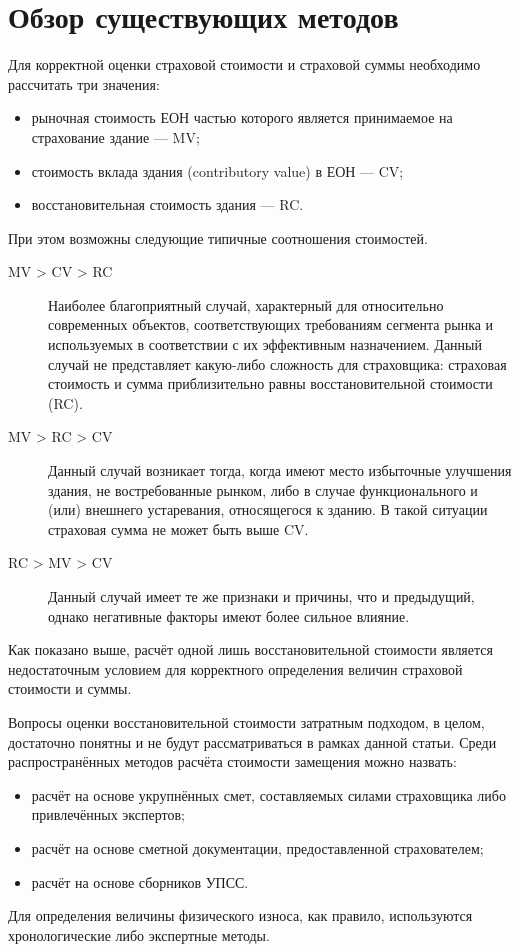 \documentclass[12pt]{scrartcl}
\begin{document}
\section{Обзор существующих методов}\label{LiteratureReview}
Для корректной оценки страховой стоимости и страховой суммы необходимо рассчитать три значения:
\begin{itemize}
    \item рыночная стоимость ЕОН частью которого является принимаемое на страхование здание --- MV;
    \item стоимость вклада здания (contributory value) в ЕОН --- CV;
    \item восстановительная стоимость здания --- RC.
\end{itemize}
При этом возможны следующие типичные соотношения стоимостей.
\begin{description}
    \item[MV > CV > RC] Наиболее благоприятный случай, характерный для относительно современных объектов, соответствующих требованиям сегмента рынка и используемых в соответствии с их эффективным назначением. Данный случай не представляет какую-либо сложность для страховщика: страховая стоимость и сумма приблизительно равны восстановительной стоимости (RC).
    \item[MV > RC > CV] Данный случай возникает тогда, когда имеют место избыточные улучшения здания, не востребованные рынком, либо в случае функционального и (или) внешнего устаревания, относящегося к зданию. В такой ситуации страховая сумма не может быть выше CV.
    \item[RC > MV > CV] Данный случай имеет те же признаки и причины, что и предыдущий, однако негативные факторы имеют более сильное влияние.
\end{description}
Как показано выше, расчёт одной лишь восстановительной стоимости является недостаточным условием для корректного определения величин страховой стоимости и суммы.

Вопросы оценки восстановительной стоимости затратным подходом, в целом, достаточно понятны и не будут рассматриваться в рамках данной статьи. Среди распространённых методов расчёта стоимости замещения можно назвать:
\begin{itemize}
    \item расчёт на основе укрупнённых смет, составляемых силами страховщика либо привлечённых экспертов;
    \item расчёт на основе сметной документации, предоставленной страхователем;
    \item расчёт на основе сборников УПСС.
\end{itemize}
Для определения величины физического износа, как правило, используются хронологические либо экспертные методы.
\end{document}
